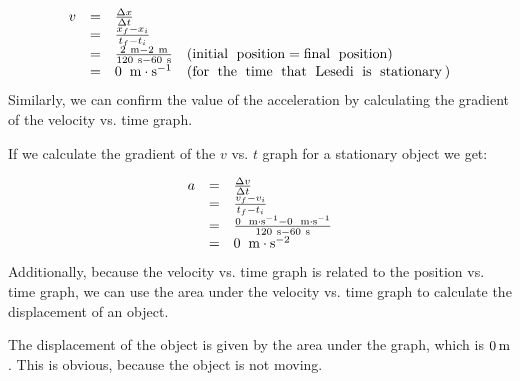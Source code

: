         \label{m38795*id69332}\nopagebreak\noindent{}
    \begin{equation*}
    \begin{array}{cccc}\hfill v& =& \frac{\Delta x}{\Delta t}\hfill & \\ & =& \frac{{x}_{f}-{x}_{i}}{{t}_{f}-{t}_{i}}\hfill & \\ & =& \frac{2\phantom{\rule{3.33333pt}{0ex}}\text{m}-2\phantom{\rule{3.33333pt}{0ex}}\text{m}}{120\phantom{\rule{3.33333pt}{0ex}}\text{s}-60\phantom{\rule{3.33333pt}{0ex}}\text{s}}\hfill & \left(\text{initial\; position}=\text{final\; position}\right)\hfill \\ & =& 0\phantom{\rule{4pt}{0ex}}\phantom{\rule{0.166667em}{0ex}}\text{m}\ensuremath{\cdot}{\text{s}}^{-1}\hfill & \left(\text{for\; the\; time\; that\; Lesedi\; is\; stationary}\phantom{\rule{2pt}{0ex}}\right)\hfill \end{array}
      \end{equation*}
        \label{m38795*id69558}Similarly, we can confirm the value of the acceleration by calculating the gradient of the velocity vs. time graph.\par 
\label{m38795*notfhsst!!!underscore!!!id2005}
	\par
        \label{m38795*id69571}If we calculate the gradient of the $v$ vs. $t$ graph for a stationary object we get:\par 
        \label{m38795*id69594}\nopagebreak\noindent{}
          
    \begin{equation*}
    \begin{array}{ccc}\hfill a& =& \frac{\Delta v}{\Delta t}\hfill \\ & =& \frac{{v}_{f}-{v}_{i}}{{t}_{f}-{t}_{i}}\hfill \\ & =& \frac{0\phantom{\rule{4pt}{0ex}}\phantom{\rule{0.166667em}{0ex}}\text{m}\ensuremath{\cdot}{\text{s}}^{-1}-0\phantom{\rule{4pt}{0ex}}\phantom{\rule{0.166667em}{0ex}}\text{m}\ensuremath{\cdot}{\text{s}}^{-1}}{120\phantom{\rule{3.33333pt}{0ex}}\text{s}-60\phantom{\rule{3.33333pt}{0ex}}\text{s}}\hfill \\ & =& 0\phantom{\rule{4pt}{0ex}}\phantom{\rule{0.166667em}{0ex}}\text{m}\ensuremath{\cdot}{\text{s}}^{-2}\hfill \end{array}
      \end{equation*}
        \label{m38795*id69809}Additionally, because the velocity vs. time graph is related to the position vs. time graph, we can use the area under the velocity vs. time graph to calculate the displacement of an object.\par 
\label{m38795*notfhsst!!!underscore!!!id2134}
	\par
        \label{m38795*id69821}The displacement of the object is given by the area under the graph, which is $0\phantom{\rule{2pt}{0ex}}\text{m}$. This is obvious, because the object is not moving.\par 
      \label{m38795*uid90}
